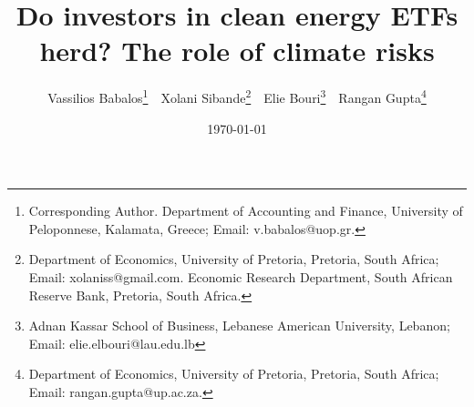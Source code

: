 \title{Do investors in clean energy ETFs herd? The role of climate risks}



\author{ 
Vassilios Babalos\footnote{Corresponding Author. Department of Accounting and Finance, University of Peloponnese, Kalamata,  Greece; Email: v.babalos@uop.gr.} \,\,
Xolani Sibande\footnote{Department of Economics, University of Pretoria, Pretoria, South Africa; Email: xolaniss@gmail.com. Economic Research Department, South African Reserve Bank, Pretoria, South Africa.} \,\, 
Elie Bouri\footnote{Adnan Kassar School of Business, Lebanese American University, Lebanon; Email: elie.elbouri@lau.edu.lb} \,\,
Rangan Gupta\footnote{Department of Economics, University of Pretoria, Pretoria, South Africa; Email: rangan.gupta@up.ac.za.} 
}
\date{\today}
\maketitle

